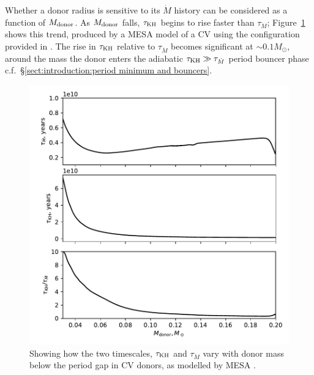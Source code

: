 Whether a donor radius is sensitive to its $\dot M$ history can be considered as a function of $M_{\rm donor}$. As $M_{\rm donor}$ falls, $\tau_{\rm KH}$ begins to rise faster than $\tau_{\dot M}$; Figure~\ref{fig:results:how does tauKH and tauMdot vary with donor mass} shows this trend, produced by a MESA model of a CV using the configuration provided in \citet{Paxton_2015}.
The rise in $\tau_{\rm KH}$ relative to $\tau_{\dot M}$ becomes significant at $\sim 0.1 M_\odot$, around the mass the donor enters the adiabatic $\tau_{\rm KH} \gg \tau_{\dot M}$ period bouncer phase c.f.~\S\ref{sect:introduction:period minimum and bouncers}.
\begin{figure}
    \centering
    \includegraphics[width=\textwidth]{figures/modelling/tau_both_vs_donor_mass_AML000.pdf}
    \caption{Showing how the two timescales, $\tau_{\rm KH}$ and $\tau_{\dot M}$ vary with donor mass below the period gap in CV donors, as modelled by MESA \citep{Paxton_2015,Pala2017a}.}
    \label{fig:results:how does tauKH and tauMdot vary with donor mass}
\end{figure}

